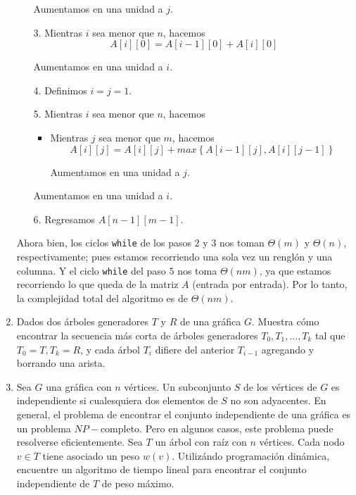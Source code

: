 \documentclass[letterpaper,11pt]{article}
\begin{document}
\begin{enumerate}
\begin{itemize}
        Aumentamos en una unidad a $j$.

        \item[3.] Mientras $i$ sea menor que $n$, hacemos 
        \begin{equation*}
            A[i][0] = A[i-1][0] + A[i][0]
        \end{equation*}

        Aumentamos en una unidad a $i$.

        \item[4.] Definimos $i = j = 1$.

        \item[5.] Mientras $i$ sea menor que $n$, hacemos 
        \begin{itemize}
            \item Mientras $j$ sea menor que $m$, hacemos 
            \begin{equation*}
                A[i][j] = A[i][j] + max\left\{A[i-1][j], A[i][j-1]\right\}
            \end{equation*}

            Aumentamos en una unidad a $j$.
        \end{itemize}

        Aumentamos en una unidad a $i$.

        \item[6.] Regresamos $A[n-1][m-1]$.
    \end{itemize}

    Ahora bien, los ciclos \texttt{while} de los pasos $2$ y $3$ nos toman 
    $\Theta(m)$ y $\Theta(n)$, respectivamente; pues estamos recorriendo una 
    sola vez un renglón y una columna. Y el ciclo \texttt{while} del paso $5$
    nos toma $\Theta(nm)$, ya que estamos recorriendo lo que queda de la 
    matriz $A$ (entrada por entrada). Por lo tanto, la complejidad total del 
    algoritmo es de $\Theta(nm)$.

    \item Dados dos árboles generadores $T$ y $R$ de una gráfica $G$. Muestra 
    cómo encontrar la secuencia más corta de árboles generadores $T_0, T_1, 
    \ldots, T_k$ tal que $T_0 = T, T_k = R$, y cada árbol $T_i$ difiere del 
    anterior $T_{i-1}$ agregando y borrando una arista.

    \item Sea $G$ una gráfica con $n$ vértices. Un subconjunto $S$ de los 
    vértices de $G$ es independiente si cualesquiera dos elementos de $S$ no 
    son adyacentes. En general, el problema de encontrar el conjunto 
    independiente de una gráfica es un problema $NP-$completo. Pero en 
    algunos casos, este problema puede resolverse eficientemente. Sea $T$ un
    árbol con raíz con $n$ vértices. Cada nodo $v \in T$ tiene asociado un peso 
    $w(v)$. Utilizándo programación dinámica, encuentre un algoritmo de tiempo 
    lineal para encontrar el conjunto independiente de $T$ de peso máximo.


\end{enumerate}
\end{document}
